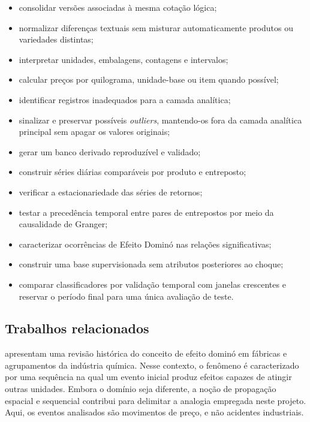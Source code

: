 \documentclass[12pt,a4paper]{article}
\begin{document}
\begin{itemize}
    \item consolidar versões associadas à mesma cotação lógica;
    \item normalizar diferenças textuais sem misturar automaticamente produtos
    ou variedades distintas;
    \item interpretar unidades, embalagens, contagens e intervalos;
    \item calcular preços por quilograma, unidade-base ou item quando possível;
    \item identificar registros inadequados para a camada analítica;
    \item sinalizar e preservar possíveis \textit{outliers}, mantendo-os fora
    da camada analítica principal sem apagar os valores originais;
    \item gerar um banco derivado reproduzível e validado;
    \item construir séries diárias comparáveis por produto e entreposto;
    \item verificar a estacionariedade das séries de retornos;
    \item testar a precedência temporal entre pares de entrepostos por meio da
    causalidade de Granger;
    \item caracterizar ocorrências de Efeito Dominó nas relações significativas;
    \item construir uma base supervisionada sem atributos posteriores ao choque;
    \item comparar classificadores por validação temporal com janelas crescentes
    e reservar o período final para uma única avaliação de teste.
\end{itemize}


\subsection{Trabalhos relacionados}

\textcite{swuste2019} apresentam uma revisão histórica do conceito de efeito
dominó em fábricas e agrupamentos da indústria química. Nesse contexto, o
fenômeno é caracterizado por uma sequência na qual um evento inicial produz
efeitos capazes de atingir outras unidades. Embora o domínio seja diferente,
a noção de propagação espacial e sequencial contribui para delimitar a analogia
empregada neste projeto. Aqui, os eventos analisados são movimentos de preço,
e não acidentes industriais.
\end{document}
